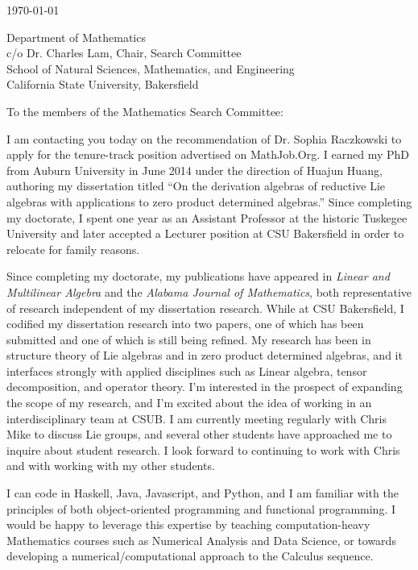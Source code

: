 \documentclass[11pt]{article}
\begin{document}
\makeletterhead{}

\vfill

\today

\vfill

Department of Mathematics\\
c/o Dr. Charles Lam, Chair, Search Committee\\
School of Natural Sciences, Mathematics, and Engineering\\
California State University, Bakersfield

\vfill

To the members of the Mathematics Search Committee:

\vfill

I am contacting you today on the recommendation of Dr. Sophia Raczkowski
to apply for the tenure-track position advertised on MathJob.Org. I
earned my PhD from Auburn University in June 2014 under the direction of
Huajun Huang, authoring my dissertation titled ``On the derivation
algebras of reductive Lie algebras with applications to zero product
determined algebras.'' Since completing my doctorate, I spent one year
as an Assistant Professor at the historic Tuskegee University and later
accepted a Lecturer position at CSU Bakersfield in order to relocate for
family reasons.

Since completing my doctorate, my publications have appeared in
\emph{Linear and Multilinear Algebra} and the \emph{Alabama Journal of
Mathematics}, both representative of research independent of my
dissertation research. While at CSU Bakersfield, I codified my
dissertation research into two papers, one of which has been submitted
and one of which is still being refined. My research has been in
structure theory of Lie algebras and in zero product determined
algebras, and it interfaces strongly with applied disciplines such as
Linear algebra, tensor decomposition, and operator theory. I'm
interested in the prospect of expanding the scope of my research, and
I'm excited about the idea of working in an interdisciplinary team at
CSUB. I am currently meeting regularly with Chris Mike to discuss Lie
groups, and several other students have approached me to inquire about
student research. I look forward to continuing to work with Chris and
with working with my other students.

I can code in Haskell, Java, Javascript, and Python, and I am familiar
with the principles of both object-oriented programming and functional
programming. I would be happy to leverage this expertise by teaching
computation-heavy Mathematics courses such as Numerical Analysis and
Data Science, or towards developing a numerical/computational approach
to the Calculus sequence.
\end{document}

